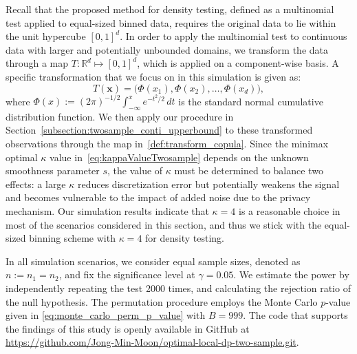 \documentclass[twoside,11pt]{article}
\newcommand{\dimDensity}{d} %
\newcommand{\sampleSize}{n}
\newcommand{\smoothness}{s}
\newcommand{\sizeMonteCarlo}{B}
\newcommand{\maxErrorTypeOne}{\gamma} %
\newcommand{\binNum}{\kappa}           %
\begin{document}
Recall that the proposed method for density testing, defined as a multinomial test applied to equal-sized binned data, requires the original data to lie within the unit hypercube $[0,1]^\dimDensity$. In order to apply the multinomial test to continuous data with larger and potentially unbounded domains, we transform the data through a map \(T : \mathbb{R}^d \mapsto [0,1]^d\), which is applied on a component-wise basis. A specific transformation that we focus on in this simulation is given as:
\begin{equation}\label{def:transform_copula}
	T(\mathbf{x}) = \bigl(\Phi(x_1), \Phi(x_2), \ldots, \Phi(x_d)\bigr),   
\end{equation}
where \(\Phi(x) := (2\pi)^{-1/2} \int_{-\infty}^{x} e^{-t^2/2} \, dt\) is the standard normal cumulative distribution function. We then apply our procedure in Section~\ref{subsection:twosample_conti_upperbound} to these transformed observations through the map in~\eqref{def:transform_copula}. Since the minimax optimal $\binNum$ value in~\eqref{eq:kappaValueTwosample} depends on the unknown smoothness parameter $\smoothness$, the value of $\binNum$ must be determined to balance two effects: a large $\binNum$ reduces discretization error but potentially weakens the signal and becomes vulnerable to the impact of added noise due to the privacy mechanism. Our simulation results indicate that $\binNum=4$ is a reasonable choice in most of the scenarios considered in this section, and thus we stick with the equal-sized binning scheme with $\binNum=4$ for density testing. 

In all simulation scenarios, we consider equal sample sizes, denoted as \(\sampleSize := \sampleSize_1 = \sampleSize_2\), and fix the significance level at \(\maxErrorTypeOne = 0.05\). We estimate the power by independently repeating the test 2000 times, and calculating the rejection ratio of the null hypothesis. The permutation procedure employs the Monte Carlo $p$-value given in \eqref{eq:monte_carlo_perm_p_value} with \(\sizeMonteCarlo = 999\).
The code that supports the findings of this study is openly available in GitHub at \url{https://github.com/Jong-Min-Moon/optimal-local-dp-two-sample.git}.
\end{document}
